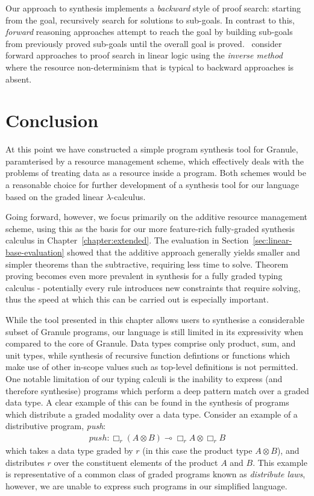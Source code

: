 Our approach to synthesis implements a \textit{backward} style of proof search:
starting from the goal, recursively search for solutions to sub-goals. In
contrast to this, \textit{forward} reasoning approaches attempt to reach the
goal by building sub-goals from previously proved sub-goals until the overall
goal is proved.~\citet{10.1007/11532231_6,10.1007/11538363_15} consider forward
approaches to proof search in linear logic using the \textit{inverse
method}~\citep{DEGTYAREV2001179} where the resource non-determinism
that is typical to backward approaches is absent.

\section{Conclusion}
\label{sec:linear-base-conclusion}

At this point we have constructed a simple program synthesis tool for Granule,
paramterised by a resource management scheme, which effectively deals with the
problems of treating data as a resource inside a program. Both schemes would be
a reasonable choice for further development of a synthesis tool for our language
based on the graded linear $\lambda$-calculus.   

Going forward, however, we focus primarily on the additive resource management
scheme, using this as the basis for our more feature-rich fully-graded synthesis
calculus in Chapter~\ref{chapter:extended}.  
The evaluation in Section~\ref{sec:linear-base-evaluation} showed that the
additive approach generally yields smaller and simpler theorems than the
subtractive, requiring less time to solve. Theorem proving becomes even more
prevalent in synthesis for a fully graded typing calculus - potentially every
rule introduces new constraints that require solving, thus the speed at which
this can be carried out is especially important.

While the tool presented in this chapter allows users to synthesise a
considerable subset of Granule programs, our language is still limited in its
expressivity when compared to the core of Granule. Data types comprise only
product, sum, and unit types, while synthesis of recursive function defintions
or functions which make use of other in-scope values such as top-level
definitions is not permitted. One notable limitation of our typing calculi is
the inability to express (and therefore synthesise) programs which perform a
deep pattern match over a graded data type. A clear example of this can be found
in the synthesis of programs which distribute a graded modality over a data
type. Consider an example of a distributive program, \textit{push}:
\begin{align*}
  push: \Box_r(A \otimes B) \multimap \Box_r A \otimes \Box_r B
\end{align*}
which takes a data type graded by $r$ (in this case the product type $A \otimes
B$), and distributes $r$ over the constituent elements of the product $A$ and
$B$. This example is representative of a common class of graded programs known
as \emph{distribute laws}, however, we are unable to express such programs in
our simplified language.

